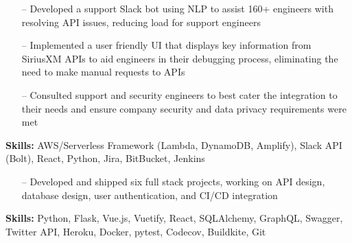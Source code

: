 \documentclass[9pt,a4paper]{altacv}
\begin{document}

\begin{itemize}
    \setlength{\itemindent}{0.5em}
    \item[--] Developed a support Slack bot using NLP to assist 160+ engineers with resolving API issues, reducing load for support engineers
    \item[--] Implemented a user friendly UI that displays key information from SiriusXM APIs to aid engineers in their debugging process, eliminating the need to make manual requests to APIs
    \item[--] Consulted support and security engineers to best cater the integration to their needs and ensure company security and data privacy requirements were met
\end{itemize}
\smallskip
\textbf{Skills:} AWS/Serverless Framework (Lambda, DynamoDB, Amplify), Slack API (Bolt), React, Python, Jira, BitBucket, Jenkins

\divider





\begin{itemize}
    \setlength{\itemindent}{0.5em}
    \item[--] Developed and shipped six full stack projects, working on API design, database design, user authentication, and CI/CD integration
\end{itemize}
\smallskip
\textbf{Skills:} Python, Flask, Vue.js, Vuetify, React, SQLAlchemy, GraphQL, Swagger, Twitter API, Heroku, Docker, pytest, Codecov, Buildkite, Git

\medskip
\end{document}
